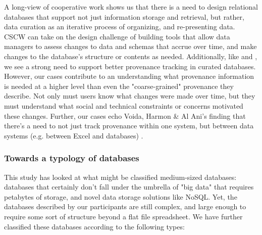 A long-view of cooperative work shows us that there is a need to design relational databases that support not just information storage and retrieval, but rather, data curation as an iterative process of organizing, and re-presenting data. CSCW can take on the design challenge of building tools that allow data managers to assess changes to data and schemas that accrue over time, and make changes to the database's structure or contents as needed. Additionally, like \cite{Buneman_2006} and \cite{jagadish2007making}, we see a strong need to support better provenance tracking in curated databases. However, our cases contribute to an understanding what provenance information is needed at a higher level than even the "coarse-grained" provenance they describe. Not only must users know what changes were made over time, but they must understand what social and technical constraints or concerns motivated these changes. Further, our cases echo Voida, Harmon & Al Ani's finding that there's a need to not just track provenance within one system, but between data systems (e.g. between Excel and databases) \cite{voida2011homebrew}.

\subsubsection{Towards a typology of databases}

This study has looked at what might be classified medium-sized databases: databases that certainly don't fall under the umbrella of "big data" that requires petabytes of storage, and novel data storage solutions like NoSQL. Yet, the databases described by our participants are still complex, and large enough to require some sort of structure beyond a flat file spreadsheet. We have further classified these databases according to the following types:

